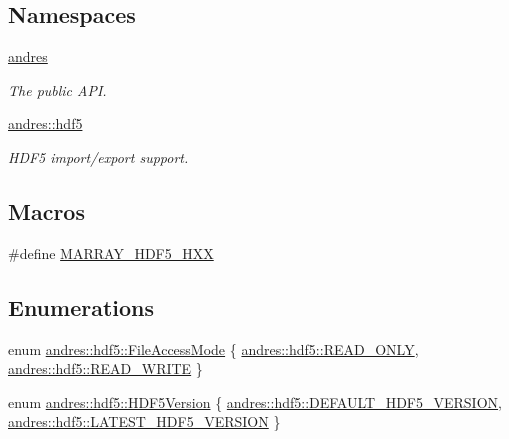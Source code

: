 \subsection*{Namespaces}
\begin{DoxyCompactItemize}
\item 
 \hyperlink{namespaceandres}{andres}
\begin{DoxyCompactList}\small\item\em The public A\+PI. \end{DoxyCompactList}\item 
 \hyperlink{namespaceandres_1_1hdf5}{andres\+::hdf5}
\begin{DoxyCompactList}\small\item\em H\+D\+F5 import/export support. \end{DoxyCompactList}\end{DoxyCompactItemize}
\subsection*{Macros}
\begin{DoxyCompactItemize}
\item 
\#define \hyperlink{marray-hdf5_8hxx_aabd36af6695d6700abdc06a2b435b735}{M\+A\+R\+R\+A\+Y\+\_\+\+H\+D\+F5\+\_\+\+H\+XX}
\end{DoxyCompactItemize}
\subsection*{Enumerations}
\begin{DoxyCompactItemize}
\item 
enum \hyperlink{namespaceandres_1_1hdf5_a08660935c7de0e1e76e007fc972933b9}{andres\+::hdf5\+::\+File\+Access\+Mode} \{ \hyperlink{namespaceandres_1_1hdf5_a08660935c7de0e1e76e007fc972933b9af05cb745b770e55c64efe88162f7e9fb}{andres\+::hdf5\+::\+R\+E\+A\+D\+\_\+\+O\+N\+LY}, 
\hyperlink{namespaceandres_1_1hdf5_a08660935c7de0e1e76e007fc972933b9af215ccdde9335c237c14b7c1d35766d4}{andres\+::hdf5\+::\+R\+E\+A\+D\+\_\+\+W\+R\+I\+TE}
 \}
\item 
enum \hyperlink{namespaceandres_1_1hdf5_ad5194a7b8773d3776e8dfc068f58f41b}{andres\+::hdf5\+::\+H\+D\+F5\+Version} \{ \hyperlink{namespaceandres_1_1hdf5_ad5194a7b8773d3776e8dfc068f58f41baf4fdc18c306e5d07105ad62a1cf6fa93}{andres\+::hdf5\+::\+D\+E\+F\+A\+U\+L\+T\+\_\+\+H\+D\+F5\+\_\+\+V\+E\+R\+S\+I\+ON}, 
\hyperlink{namespaceandres_1_1hdf5_ad5194a7b8773d3776e8dfc068f58f41ba29da3f0202bdf4ea2b036678ae7aa717}{andres\+::hdf5\+::\+L\+A\+T\+E\+S\+T\+\_\+\+H\+D\+F5\+\_\+\+V\+E\+R\+S\+I\+ON}
 \}
\end{DoxyCompactItemize}
